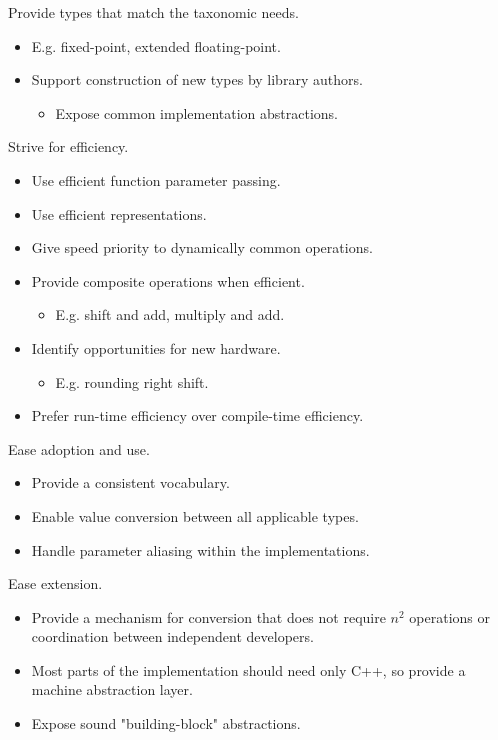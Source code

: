 Provide types that match the taxonomic needs.

\begin{itemize}
\item E.g. fixed-point, extended floating-point.
\item Support construction of new types by library authors.
\begin{itemize}
\item Expose common implementation abstractions.
\end{itemize}	
\end{itemize}

Strive for efficiency.

\begin{itemize}
\item Use efficient function parameter passing.
\item Use efficient representations.
\item Give speed priority to dynamically common operations.
\item Provide composite operations when efficient.
\begin{itemize}
\item E.g. shift and add, multiply and add.
\end{itemize}
\item Identify opportunities for new hardware.
\begin{itemize}
\item E.g. rounding right shift.
\end{itemize}
\item Prefer run-time efficiency over compile-time efficiency.
\end{itemize}

Ease adoption and use.

\begin{itemize}
\item Provide a consistent vocabulary.
\item Enable value conversion between all applicable types.
\item Handle parameter aliasing within the implementations.
\end{itemize}

Ease extension.

\begin{itemize}
\item Provide a mechanism for conversion that does not require $n^{2}$ operations or coordination between independent developers.
\item Most parts of the implementation should need only C++, so provide a machine abstraction layer.
\item Expose sound "building-block" abstractions.
\end{itemize}

